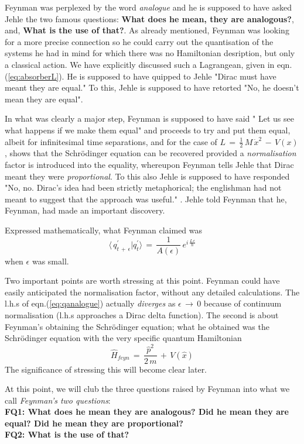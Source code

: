 \documentclass[a4paper]{JHEP3}
\newcommand{\be}{\begin{equation}}
\newcommand{\ee}{\end{equation}}
\begin{document}
Feynman was perplexed by the word {\it analogue} and he is supposed to have asked Jehle the two famous questions:
{\bf What does he mean, they are analogous?}, and, {\bf What is the use of that?}. As already mentioned,
Feynman was looking for a more precise connection so he could carry out the quantisation of the systems he had in mind for which
there was no Hamiltonian desription, but only a classical action. We have explicitly discussed such a Lagrangean, given in 
eqn.(\ref{eq:absorberL}). He is supposed to have quipped to Jehle "Dirac must have meant they are
equal." To this, Jehle is supposed to have retorted "No, he doesn't mean they are equal".  

In what was clearly a major step, Feynman is supposed to have said " Let us see what happens if we make them equal" and proceeds to try 
and put them equal, albeit for infinitesimal time separations, and
for the case of $L\,=\,\frac{1}{2}\,M\,{\dot x}^2\,-\,V(x)$, shows that the Schr\"odinger equation can be recovered provided a 
{\it normalisation} factor is introduced into the equality, whereupon Feynman tells Jehle that Dirac meant they were {\it proportional}. To
this also Jehle is supposed to have responded "No, no. Dirac's idea had been strictly metaphorical; the englishman had not meant to
suggest that the approach was useful." \cite{gleick}. Jehle told Feynman that he, Feynman, had made an important discovery.

Expressed mathematically, what Feynman claimed was
\be
\label{eq:missinglink0}
\langle\,q_{t\,+\,\epsilon}^\prime|q_t^\prime\rangle\,=\,\frac{1}{A(\epsilon)}\,e^{i\,\frac{L\,\epsilon}{\hbar}}
\ee
when $\epsilon$ was small.


Two important points are worth stressing at this point. Feynman could have easily anticipated the normalisation factor, without any
detailed calculations. The l.h.s of eqn.(\ref{eq:qanalogue}) actually \emph{diverges} as $\epsilon\,\rightarrow\,0$ because of continuum 
normalisation (l.h.s approaches a Dirac delta function). The second is about Feynman's obtaining the Schr\"odinger equation; what he obtained
was the Schr\"odinger equation with the very specific quantum Hamiltonian
\be
\label{eq:feynHq}
{\hat H}_{feyn}\,=\,\frac{{\hat p}^2}{2\,m}\,+\,V({\hat x})
\ee
The significance of stressing this will become clear later.

At this point, we will club the three questions raised by Feynman into what we call \emph{Feynman's two questions}:\\
{\bf FQ1: What does he mean they are analogous? Did he mean they are equal? Did he mean they are proportional?}\\
{\bf FQ2: What is the use of that?}\\
\end{document}

